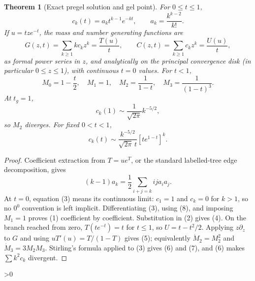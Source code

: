 \documentclass[11pt]{article}
\newtheorem{theorem}{Theorem}
\begin{document}
\begin{theorem}[Exact pregel solution and gel point]\label{thm:pre}
For $0\le t\le1$,
\begin{equation}
 c_k(t)=a_kt^{k-1}e^{-kt},\qquad
 a_k=\frac{k^{k-2}}{k!}.                               \tag{3}
\end{equation}
If $u=tze^{-t}$, the mass and number generating functions are
\begin{equation}
 G(z,t)=\sum_{k\ge1}kc_kz^k=\frac{T(u)}t,\qquad
 C(z,t)=\sum_{k\ge1}c_kz^k=\frac{U(u)}t,              \tag{4}
\end{equation}
as formal power series in $z$, and analytically on the principal convergence
disk (in particular $0\le z\le1$), with continuous $t=0$ values.  For $t<1$,
\begin{equation}
 M_0=1-\frac t2,\quad M_1=1,\quad
 M_2=\frac1{1-t},\quad M_3=\frac1{(1-t)^3}.            \tag{5}
\end{equation}
At $t_g=1$,
\begin{equation}
 c_k(1)\sim\frac1{\sqrt{2\pi}}k^{-5/2},               \tag{6}
\end{equation}
so $M_2$ diverges.  For fixed $0<t<1$,
\begin{equation}
 c_k(t)\sim\frac{k^{-5/2}}{\sqrt{2\pi}\,t}
              [te^{1-t}]^k.                            \tag{7}
\end{equation}
\end{theorem}

\begin{proof}
Coefficient extraction from $T=ue^T$, or the standard labelled-tree edge
decomposition, gives
\begin{equation}
 (k-1)a_k=\frac12\sum_{i+j=k}ij a_i a_j.               \tag{8}
\end{equation}
At $t=0$, equation (3) means its continuous limit: $c_1=1$ and $c_k=0$ for
$k>1$, so no $0^0$ convention is left implicit.  Differentiating (3), using
(8), and imposing $M_1=1$ proves (1) coefficient by
coefficient.  Substitution in (2) gives (4).  On the branch reached from zero,
$T(te^{-t})=t$ for $t\le1$, so $U=t-t^2/2$.  Applying
$z\partial_z$ to $G$ and using
$uT'(u)=T/(1-T)$ gives (5); equivalently
$\dot M_2=M_2^2$ and $\dot M_3=3M_2M_3$.  Stirling's formula applied to (3)
gives (6) and (7), and (6) makes $\sum k^2c_k$ divergent.
\end{proof}

\ifnum\CRevisionRound>0
\end{document}
